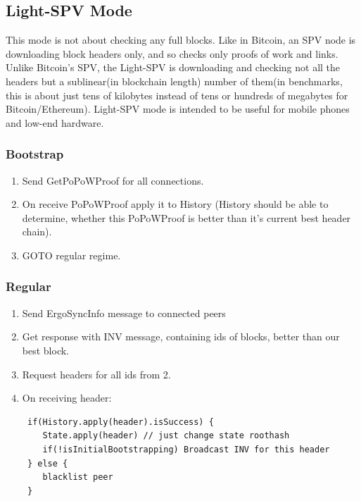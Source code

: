 \documentclass[]{article}   %
\begin{document}
\subsection{Light-SPV Mode}
This mode is not about checking any full blocks. Like in Bitcoin, an SPV node is downloading block headers only, and so checks only proofs of work and links. Unlike Bitcoin’s SPV, the Light-SPV is downloading and checking not all the headers but a sublinear(in blockchain length) number of them(in benchmarks, this is about just tens of kilobytes instead of tens or hundreds of megabytes for Bitcoin/Ethereum).
Light-SPV mode is intended to be useful for mobile phones and low-end hardware.
\subsubsection{Bootstrap}
\begin{enumerate}
\item Send GetPoPoWProof for all connections.
\item On receive PoPoWProof apply it to History (History should be able to determine, whether this PoPoWProof is better than it's current best header chain).
\item GOTO regular regime.
\end{enumerate}
\subsubsection{Regular}
\begin{enumerate}
\item Send ErgoSyncInfo message to connected peers
\item Get response with INV message, containing ids of blocks, better than our best block.
\item Request headers for all ids from 2.
\item On receiving header:
\begin{verbatim}
 if(History.apply(header).isSuccess) {
    State.apply(header) // just change state roothash
    if(!isInitialBootstrapping) Broadcast INV for this header
 } else {
    blacklist peer
 }
\end{verbatim}
\end{enumerate}
\end{document}
